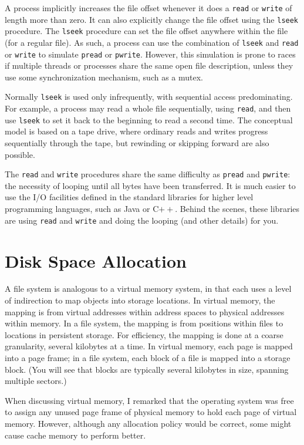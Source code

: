 A process implicitly increases the file offset whenever it does a
\verb|read| or \verb|write| of length more than zero.  It can also
explicitly change the file offset using the
\verb|lseek| procedure.  The \verb|lseek|
procedure can set the file offset anywhere within the file (for a
regular file).  As such, a process can use the combination of
\verb|lseek| and \verb|read| or
\verb|write| to simulate \verb|pread| or \verb|pwrite|.  However,
this simulation is prone to races if multiple threads or processes
share the same open file description, unless they use some synchronization
mechanism, such as a mutex.

Normally \verb|lseek| is used only infrequently, with sequential
access predominating.  For example, a process may read a whole file
sequentially, using \verb|read|, and then use \verb|lseek| to set it
back to the beginning to read a second time.  The conceptual model is
based on a tape drive, where ordinary reads and writes progress
sequentially through the tape, but rewinding or skipping forward are
also possible.

The \verb|read| and \verb|write| procedures share the same difficulty
as \verb|pread| and \verb|pwrite|:
the necessity of looping until all bytes have been
transferred.  It is much easier to use the I/O facilities
defined in the standard libraries for higher level programming
languages, such as Java or C$++$.  Behind the scenes, these
libraries are using \verb|read| and \verb|write| and doing the
looping (and other details) for you.


\section{Disk Space Allocation}\label{disk-allocation-section}

A file system is analogous to a virtual
memory system, in that each uses a level of indirection to map objects
into storage locations.  In virtual memory, the mapping is from
virtual addresses within address spaces to physical addresses within
memory.  In a file system, the mapping is from positions within files
to locations in persistent storage.  For efficiency, the mapping is done at a coarse
granularity, several kilobytes at a time.  In virtual memory, each
page is mapped into a page frame; in a file system, each block of a
file is mapped into a storage block.  (You will see that blocks are
typically several kilobytes in size, spanning multiple sectors.)

When discussing virtual memory, I remarked that the operating system
was free to assign any unused page frame of physical memory to hold
each page of virtual memory.  However, although any allocation policy
would be correct, some might cause cache memory to perform better.

